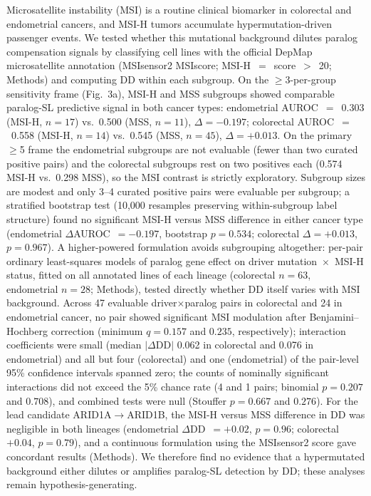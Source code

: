 \documentclass[11pt,a4paper]{article}
\begin{document}
Microsatellite instability (MSI) is a routine clinical biomarker in colorectal and endometrial cancers, and MSI-H tumors accumulate hypermutation-driven passenger events. We tested whether this mutational background dilutes paralog compensation signals by classifying cell lines with the official DepMap microsatellite annotation (MSIsensor2 MSIscore; MSI-H~$=$~score~$>$~20; Methods) and computing DD within each subgroup. On the $\geq$3-per-group sensitivity frame (Fig.~3a), MSI-H and MSS subgroups showed comparable paralog-SL predictive signal in both cancer types: endometrial AUROC~$=$~0.303 (MSI-H, $n=17$) vs.\ 0.500 (MSS, $n=11$), $\Delta=-0.197$; colorectal AUROC~$=$~0.558 (MSI-H, $n=14$) vs.\ 0.545 (MSS, $n=45$), $\Delta=+0.013$. On the primary $\geq$5 frame the endometrial subgroups are not evaluable (fewer than two curated positive pairs) and the colorectal subgroups rest on two positives each (0.574 MSI-H vs.\ 0.298 MSS), so the MSI contrast is strictly exploratory. Subgroup sizes are modest and only 3--4 curated positive pairs were evaluable per subgroup; a stratified bootstrap test (10,000 resamples preserving within-subgroup label structure) found no significant MSI-H versus MSS difference in either cancer type (endometrial $\Delta$AUROC~$=-0.197$, bootstrap $p=0.534$; colorectal $\Delta=+0.013$, $p=0.967$). A higher-powered formulation avoids subgrouping altogether: per-pair ordinary least-squares models of paralog gene effect on driver mutation~$\times$~MSI-H status, fitted on all annotated lines of each lineage (colorectal $n=63$, endometrial $n=28$; Methods), tested directly whether DD itself varies with MSI background. Across 47 evaluable driver$\times$paralog pairs in colorectal and 24 in endometrial cancer, no pair showed significant MSI modulation after Benjamini--Hochberg correction (minimum $q=0.157$ and $0.235$, respectively); interaction coefficients were small (median $|\Delta\text{DD}|$ 0.062 in colorectal and 0.076 in endometrial) and all but four (colorectal) and one (endometrial) of the pair-level 95\% confidence intervals spanned zero; the counts of nominally significant interactions did not exceed the 5\% chance rate (4 and 1 pairs; binomial $p=0.207$ and $0.708$), and combined tests were null (Stouffer $p=0.667$ and $0.276$). For the lead candidate ARID1A$\rightarrow$ARID1B, the MSI-H versus MSS difference in DD was negligible in both lineages (endometrial $\Delta$DD~$=+0.02$, $p=0.96$; colorectal $+0.04$, $p=0.79$), and a continuous formulation using the MSIsensor2 score gave concordant results (Methods). We therefore find no evidence that a hypermutated background either dilutes or amplifies paralog-SL detection by DD; these analyses remain hypothesis-generating.
\end{document}
